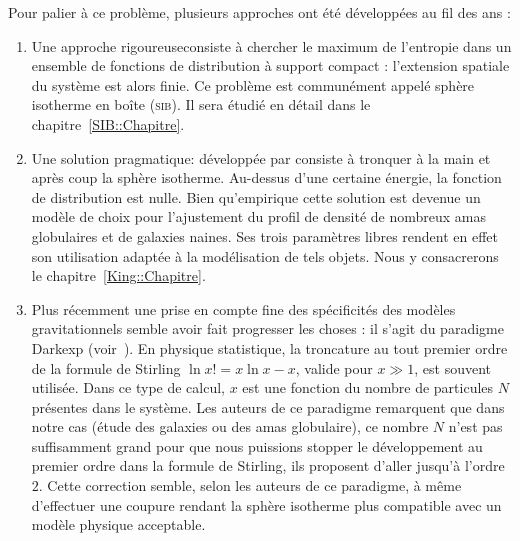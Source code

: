 Pour palier à ce problème, plusieurs approches ont été développées au fil des ans :

\begin{enumerate}
	\item Une approche \og{}rigoureuse\fg consiste à chercher le maximum de l'entropie dans un ensemble de fonctions de distribution à support compact :
		l'extension spatiale du système est alors finie. Ce problème est communément appelé sphère
		isotherme en boîte (\textsc{sib}). Il sera étudié en détail dans le chapitre~\ref{SIB::Chapitre}.
		
	\item Une solution \og{}pragmatique\fg: développée par \cite{King-1966AJ} consiste à tronquer à la main
		et après coup la sphère isotherme. Au-dessus d'une certaine énergie, la fonction de
		distribution est nulle. Bien qu'empirique cette solution est devenue un modèle de choix pour
		l'ajustement du profil de densité de nombreux amas globulaires et de galaxies naines. Ses trois
		paramètres libres rendent en effet son utilisation adaptée à la modélisation de tels objets.
		Nous y consacrerons le chapitre~\ref{King::Chapitre}.
	
	\item Plus récemment une prise en compte fine des spécificités des modèles gravitationnels semble avoir fait progresser les choses :
		il s'agit du paradigme Darkexp (voir~\citet{2010ApJ...722..851H}). En physique statistique, la troncature au tout premier ordre de la
		formule de Stirling $\ln x! = x\ln x
		-x$, valide pour $x\gg1$, est souvent utilisée. Dans ce type de calcul, $x$ est une fonction du nombre de particules $N$
		présentes dans le système. Les auteurs de ce paradigme remarquent que dans notre cas (étude des galaxies ou des amas
		globulaire), ce nombre $N$ n'est pas suffisamment grand pour que nous puissions stopper le développement au premier ordre dans la
		formule de Stirling, ils proposent d'aller jusqu'à l'ordre $2$. Cette
		correction semble, selon les auteurs de ce paradigme, à même d'effectuer une coupure rendant la sphère isotherme plus
		compatible avec un modèle physique acceptable.

\end{enumerate}
